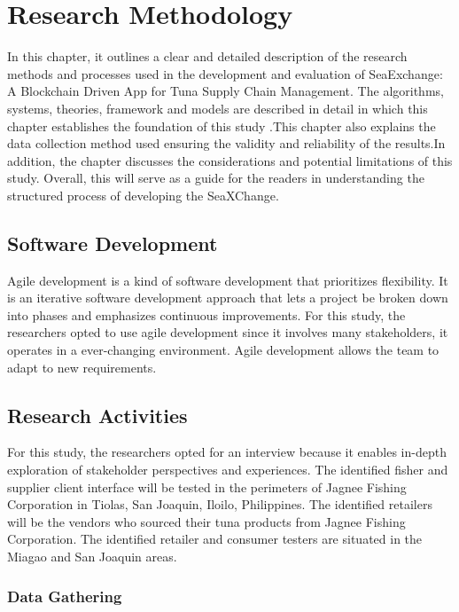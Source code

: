 \chapter{Research Methodology}
In this chapter, it outlines a clear and detailed description of the research methods and processes used in the development and evaluation of SeaExchange: A Blockchain Driven App for Tuna Supply Chain Management. The algorithms, systems, theories, framework and models are described in detail in which this chapter establishes the foundation of this study .This chapter also explains the data collection method used ensuring the validity and reliability of the results.In addition, the chapter discusses the considerations and potential limitations of this study. Overall, this will serve as a guide for the readers in understanding the structured process of developing the SeaXChange.

\section{Software Development}
Agile development is a kind of software development that prioritizes flexibility. It is an iterative software development approach that lets a project be broken down into phases and emphasizes continuous improvements. For this study, the researchers opted to use agile development since it involves many stakeholders, it operates in a ever-changing environment. Agile development allows the team to adapt to new requirements.
\section{Research Activities}
For this study, the researchers opted for an interview because it enables in-depth exploration of stakeholder perspectives and experiences. 
The identified fisher and supplier client interface will be tested in the perimeters of Jagnee Fishing Corporation in Tiolas, San Joaquin, Iloilo, Philippines. The identified retailers will be the vendors who sourced their tuna products from Jagnee Fishing Corporation. The identified retailer and consumer testers are situated in the Miagao and San Joaquin areas. 

\subsection{Data Gathering}

